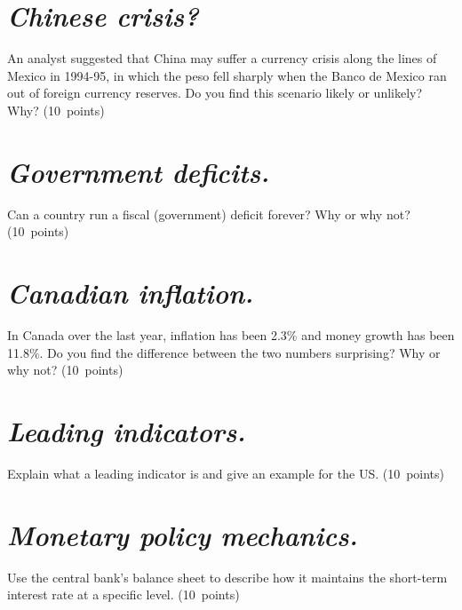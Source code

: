 \documentclass[letterpaper,12pt]{exam}
\begin{document}
\begin{questions}
\begin{solution}
\begin{parts}

\end{parts}
\end{solution}


\begin{parts}
\part {\it Chinese crisis?\/}
An analyst suggested that China may suffer a currency crisis
along the lines of Mexico in 1994-95,
in which the peso fell sharply when the Banco de Mexico
ran out of foreign currency reserves.
Do you find this scenario likely or unlikely?  Why?
 (10~points)

\part {\it Government deficits.\/}
Can a country run a fiscal (government) deficit forever?
Why or why not?
 (10~points)


\part {\it Canadian inflation.\/}
In Canada over the last year, inflation has been 2.3\%
and money growth  has been 11.8\%.
Do you find the difference between the two numbers surprising?
Why or why not?  (10~points)

\part {\it Leading indicators.\/}
Explain what a leading indicator is
and give an example for the US.  (10~points)

\part {\it Monetary policy mechanics.\/}
Use the central bank's balance sheet to describe
how it
maintains the short-term interest rate at a specific level.
(10~points)
\end{parts}


\end{questions}
\end{document}
